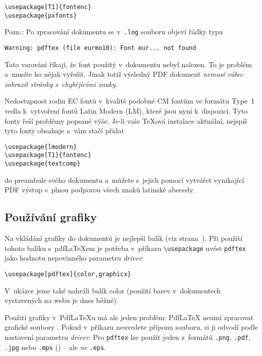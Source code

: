 \begin{code}
\begin{verbatim}
\usepackage[T1]{fontenc}
\usepackage{pxfonts}
\end{verbatim}
\end{code}

Pozn.: Po zpracování dokumentu se v~\texttt{.log} souboru objeví
řádky typu
\begin{verbatim}
Warning: pdftex (file eurmo10): Font eur... not found
\end{verbatim}
Tato varování říkají, že font použitý v~dokumentu nebyl nalezen. To
je problém a~musíte ho nějak vyřešit. Jinak totiž výsledný PDF dokument
\emph{nemusí vůbec zobrazit stránky s~chybějícími znaky}.

Nedostupnost rodin EC fontů v~kvalitě podobné
CM fontům ve formátu Type~1 vedla k~vytvoření fontů Latin Modern (LM),
které jsou nyní k~dispozici. Tyto fonty řeší problémy popsané výše.
Je-li vaše \TeX ová instalace aktuální, nejspíš tyto fonty obsahuje
a~vám stačí přidat 
\begin{code}
\begin{verbatim}  
\usepackage{lmodern}
\usepackage[T1]{fontenc} 
\usepackage{textcomp}
\end{verbatim}
\end{code}
do preambule svého dokumentu a~můžete s~jejich pomocí vytvářet vynikající
PDF výstup s~plnou podporou všech znaků latinské abecedy.


\subsection{Používání grafiky}
\label{ssec:pdfgraph}

Na vkládání grafiky do dokumentů je nejlepší balík 
(viz strana~\pageref{eps}). Při použití tohoto balíku
s~pdf\LaTeX em je potřeba v~příkazu \verb+\usepackage+ uvést
\texttt{pdftex} jako hodnotu nepovinného parametru \emph{driver}:
\begin{code}
\begin{verbatim}
\usepackage[pdftex]{color,graphicx}
\end{verbatim}
\end{code}
V~ukázce jsme také nahráli balík \textsf{color} (použití barev
v~dokumentech vystavených na webu je dnes běžné).

Použití grafiky v~Pdf\LaTeX u má ale jeden
problém: Pdf\LaTeX{} neumí zpracovat grafické soubory \EPSi{}.
Pokud v~příkazu  neuvedete příponu souboru,
 si ji odvodí podle nastavení parametru \emph{driver}.
Pro \texttt{pdftex} lze použít jeden z~formátů \texttt{.png},
\texttt{.pdf}, \texttt{.jpg} nebo \texttt{.mps}
(\MP{}) -- ale \emph{ne} \texttt{.eps}.

